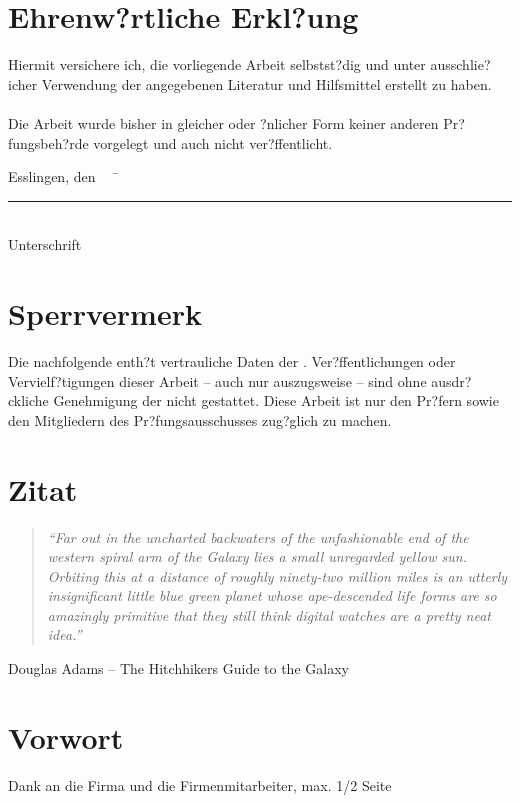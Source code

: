 \chapter*{Ehrenw?rtliche Erkl?ung}

Hiermit versichere ich, die vorliegende Arbeit selbstst?dig und unter ausschlie?icher Verwendung der angegebenen Literatur und Hilfsmittel erstellt zu haben.\\\\
Die Arbeit wurde bisher in gleicher oder ?nlicher Form keiner anderen Pr?fungsbeh?rde vorgelegt und auch nicht ver?ffentlicht.\\
\begin{tabbing}
          Esslingen, den \workDatum ~~	\= \rule{5cm}{0.3mm}\\
                                                                                                    \> Unterschrift
\end{tabbing}
%
\newpage
%
\chapter*{Sperrvermerk} %

Die nachfolgende \workTyp enth?t vertrauliche Daten der \workFirma.
Ver?ffentlichungen oder Vervielf?tigungen dieser Arbeit -- auch nur auszugsweise -- sind ohne ausdr?ckliche Genehmigung der \workFirma nicht gestattet.
Diese Arbeit ist nur den Pr?fern sowie den Mitgliedern des Pr?fungsausschusses zug?glich zu machen.
\newpage
%
\chapter*{Zitat} %
\begin{center}
\begin{minipage}{12cm}
\begin{quotation}
\textit{\enquote{Far out in the uncharted backwaters of the unfashionable
end of the western spiral arm of the Galaxy lies a small unregarded
yellow sun. Orbiting this at a distance of roughly ninety-two
million miles is an utterly insignificant little blue green planet
whose ape-descended life forms are so amazingly primitive that they
still think digital watches are a pretty neat idea.}}
\end{quotation}
\hfill \textsf Douglas Adams -- The Hitchhikers Guide to the Galaxy
\end{minipage}
\end{center}
\newpage{}
\chapter*{Vorwort} %

Dank an die Firma und die Firmenmitarbeiter, max. 1/2 Seite

\newpage
